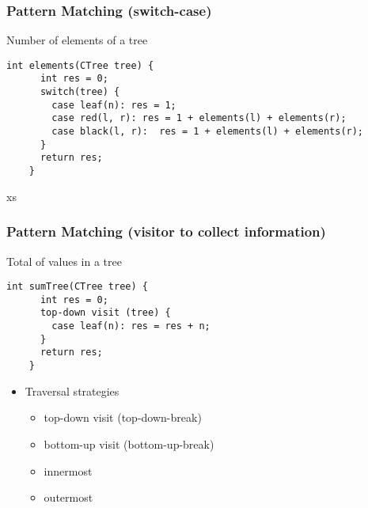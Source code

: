 \documentclass{beamer}
\begin{document}
\begin{frame}[fragile]
  \frametitle{Pattern Matching (switch-case)}

  \begin{block}{Number of elements of a tree}
    \begin{small}
    \begin{lstlisting}[language=Rascal]
    int elements(CTree tree) {
      int res = 0;
      switch(tree) {
        case leaf(n): res = 1;
        case red(l, r): res = 1 + elements(l) + elements(r);
        case black(l, r):  res = 1 + elements(l) + elements(r);
      }
      return res;
    }
\end{lstlisting}
    \end{small}xs
  \end{block}  
  
\end{frame}

\begin{frame}[fragile]
  \frametitle{Pattern Matching (visitor to collect information)}

  \begin{block}{Total of values in a tree}
    \begin{small}
\begin{lstlisting}[language=Rascal]
    int sumTree(CTree tree) {
      int res = 0;
      top-down visit (tree) {
        case leaf(n): res = res + n;
      }
      return res;
    }
\end{lstlisting}
\end{small}
  \end{block}\pause

  \begin{itemize}
    \item Traversal strategies
      \begin{itemize}
        \item top-down visit (top-down-break)
        \item bottom-up visit (bottom-up-break)
        \item innermost
        \item outermost  
      \end{itemize}  
  \end{itemize}  
\end{frame}
\end{document}
